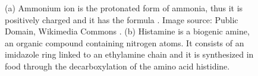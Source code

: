 \begin{figure}[ht]
    \centering
     \hspace{1cm}
    \caption{(a) Ammonium ion is the protonated form of ammonia, thus it is positively charged and it has the formula \amm{}.  Image source: Public Domain, Wikimedia Commons \citep{wikimediacommonsAmmonium2025}.
    (b) Histamine is a biogenic amine, \ie{} an organic compound containing nitrogen atoms. It consists of an imidazole ring linked to an ethylamine chain and it is synthesized in food through the decarboxylation of the amino acid histidine.}
    \label{fig:histamine}
\end{figure}

